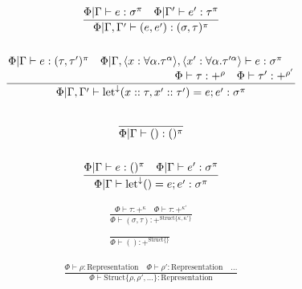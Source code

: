 \documentclass {article}
\begin{document}
\begin{gather*}
\frac
{\Phi | \Gamma \vdash e : \sigma^\pi \quad \Phi | \Gamma' \vdash e' : \tau^\pi}
{\Phi | \Gamma, \Gamma' \vdash (e, e') : (\sigma, \tau)^\pi } \\
\\
\frac
{\splitfrac{\Phi | \Gamma \vdash e : (\tau, \tau')^\pi \quad \Phi | \Gamma , \langle x : \forall \alpha. \tau^\alpha \rangle, \langle x' : \forall \alpha. \tau'^\alpha \rangle \vdash e : \sigma^\pi}
{\Phi \vdash \tau : +^{\rho} \quad \Phi \vdash \tau' : +^{\rho'} }}
{\Phi | \Gamma, \Gamma' \vdash \text{let}^\downarrow (x :: \tau, x' :: \tau') = e; e' : \sigma^\pi} \\
\\
\frac
{}
{\Phi | \Gamma \vdash () : ()^\pi} \\
\\
\frac
{\Phi | \Gamma \vdash e : ()^\pi \quad \Phi | \Gamma \vdash e' : \sigma^\pi}
{\Phi | \Gamma \vdash \text{let}^\downarrow () = e; e' : \sigma^\pi}
\end{gather*}

\begin{gather*}
\frac
{\Phi \vdash \tau : +^{\kappa} \quad \Phi \vdash \tau : +^{\kappa'} }
{\Phi \vdash (\sigma, \tau) : +^{\text{Struct} \{ \kappa,\kappa'\}}} \\
\\
\frac
{}
{\Phi \vdash () : +^{\text{Struct} \{\}}}
\end{gather*}


\begin{gather*}
\frac
{\Phi \vdash \rho : \text{Representation} \quad \Phi \vdash \rho' : \text{Representation} \quad \dots}
{\Phi \vdash \text{Struct} \{ \rho, \rho', \dots \} : \text{Representation} } \\
\end{gather*}
\end{document}
